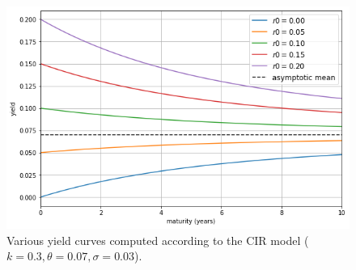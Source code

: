 \begin{figure}[htb]
\centering
\includegraphics[width=0.7\linewidth]{figures/cir_yields}
\caption{Various yield curves computed according to the CIR model ($k=0.3, \theta=0.07, \sigma=0.03$).}
\label{fig:cir_yields}
\end{figure}

